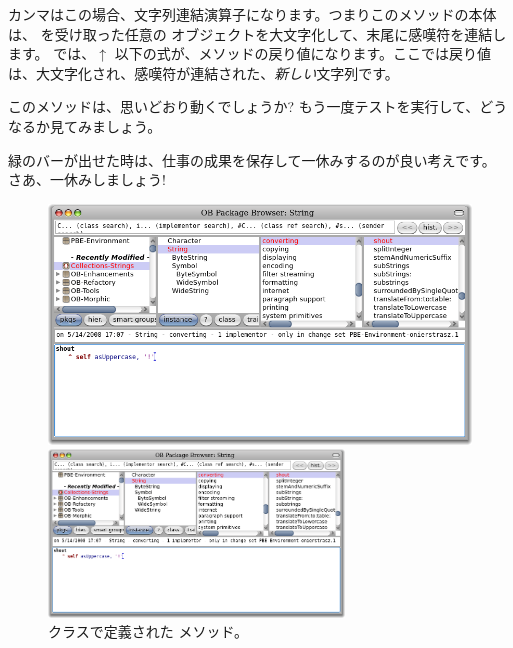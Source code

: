 \documentclass[a4paper,10pt,twoside]{book}
\begin{document}
カンマはこの場合、文字列連結演算子になります。つまりこのメソッドの本体は、 を受け取った任意の  オブジェクトを大文字化して、末尾に感嘆符を連結します。
\pharo では、$\uparrow$ 以下の式が、メソッドの戻り値になります。ここでは戻り値は、大文字化され、感嘆符が連結された、\emph{新しい}文字列です。

このメソッドは、思いどおり動くでしょうか? もう一度テストを実行して、どうなるか見てみましょう。

緑のバーが出せた時は、仕事の成果を保存して一休みするのが良い考えです。
さあ、一休みしましょう!

\begin{figure}[hbt]
\ifluluelse
	{\centerline{\includegraphics[width=\textwidth]{String-Shout}}}
	{\centerline{\includegraphics[width=0.7\textwidth]{String-Shout}}}
\caption{ クラスで定義された  メソッド。
}
\end{figure}
\end{document}
